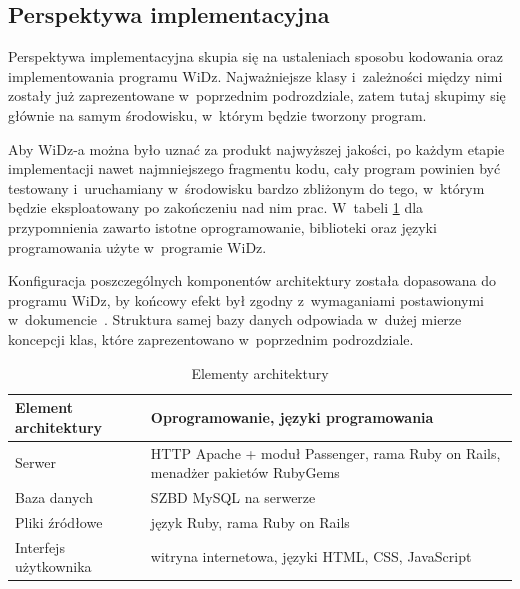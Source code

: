 \documentclass[12pt,leqno,twoside]{mwart}
\begin{document}
\subsection{Perspektywa implementacyjna}
\noindent Perspektywa implementacyjna skupia się na ustaleniach sposobu kodowania oraz implementowania programu WiDz. Najważniejsze klasy i~zależności między nimi zostały już zaprezentowane w~poprzednim podrozdziale, zatem tutaj skupimy się głównie na samym środowisku, w~którym będzie tworzony program.


\indent Aby WiDz-a można było uznać za produkt najwyższej jakości, po każdym etapie implementacji nawet najmniejszego fragmentu kodu, cały program powinien być testowany i~uruchamiany w~środowisku bardzo zbliżonym do tego, w~którym będzie eksploatowany po zakończeniu nad nim prac. W~tabeli \ref{elementy_architektury} dla przypomnienia zawarto istotne oprogramowanie, biblioteki oraz języki programowania użyte w~programie WiDz.

\indent Konfiguracja poszczególnych komponentów architektury została dopasowana do programu WiDz, by końcowy efekt był zgodny z~wymaganiami postawionymi w~dokumencie~\cite{WYM}. Struktura samej bazy danych odpowiada w~dużej mierze koncepcji klas, które zaprezentowano w~poprzednim podrozdziale.
\begin{table}[h]
	\centering
	\caption{Elementy architektury}
		\begin{tabular}{|l|p{10cm}|}
		\hline
		\textbf{Element architektury} & \textbf{Oprogramowanie, języki programowania} \\ \hline
		Serwer & HTTP Apache + moduł Passenger, rama Ruby on Rails, menadżer pakietów RubyGems \\ \hline
		Baza danych & SZBD MySQL na serwerze \\ \hline
		Pliki źródłowe & język Ruby, rama Ruby on Rails \\ \hline
		Interfejs użytkownika & witryna internetowa, języki HTML, CSS, JavaScript \\ \hline
		\end{tabular}
	\label{elementy_architektury}
\end{table}
\end{document}
